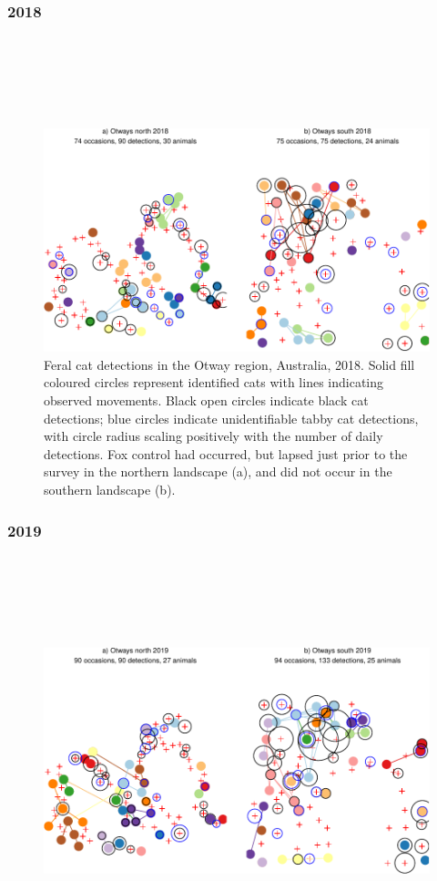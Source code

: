 \documentclass[11pt,a4paper,titlepage,twoside,openright]{style/unimelbthesis}
\begin{document}
\begin{mainmatter}
\hypertarget{section-1}{%
\subsubsection{2018}\label{section-1}}

\(~\)

\(~\)

\(~\)
\begin{figure}

{\centering \includegraphics[width=1\linewidth]{figure/density-plot-ch-5-1} 

}

\caption{Feral cat detections in the Otway region, Australia, 2018. Solid fill coloured circles represent identified cats with lines indicating observed movements. Black open circles indicate black cat detections; blue circles indicate unidentifiable tabby cat detections, with circle radius scaling positively with the number of daily detections. Fox control had occurred, but lapsed just prior to the survey in the northern landscape (a), and did not occur in the southern landscape (b).}\label{fig:density-plot-ch-5}
\end{figure}
\newpage

\hypertarget{section-2}{%
\subsubsection{2019}\label{section-2}}

\(~\)

\(~\)

\(~\)
\begin{figure}

{\centering \includegraphics[width=1\linewidth]{figure/density-plot-ch-6-1} 

}
\end{figure}
\end{mainmatter}
\end{document}
